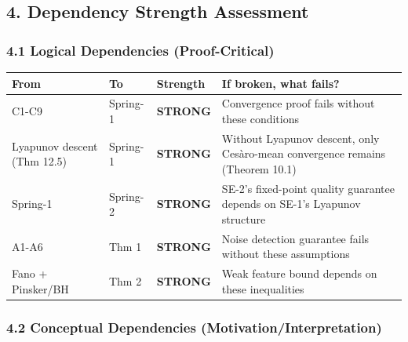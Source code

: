 \documentclass[
  12pt,
]{article}
\begin{document}
\subsection{4. Dependency Strength
Assessment}\label{dependency-strength-assessment}

\subsubsection{4.1 Logical Dependencies
(Proof-Critical)}\label{logical-dependencies-proof-critical}

\begin{longtable}[]{@{}
  >{\raggedright\arraybackslash}p{}
  >{\raggedright\arraybackslash}p{}
  >{\raggedright\arraybackslash}p{}
  >{\raggedright\arraybackslash}p{}@{}}
\toprule\noalign{}
\begin{minipage}[b]{\linewidth}\raggedright
From
\end{minipage} & \begin{minipage}[b]{\linewidth}\raggedright
To
\end{minipage} & \begin{minipage}[b]{\linewidth}\raggedright
Strength
\end{minipage} & \begin{minipage}[b]{\linewidth}\raggedright
If broken, what fails?
\end{minipage} \\
\midrule\noalign{}
\endhead
\bottomrule\noalign{}
\endlastfoot
C1-C9 & Spring-1 & \textbf{STRONG} & Convergence proof fails without
these conditions \\
Lyapunov descent (Thm 12.5) & Spring-1 & \textbf{STRONG} & Without
Lyapunov descent, only Cesàro-mean convergence remains (Theorem 10.1) \\
Spring-1 & Spring-2 & \textbf{STRONG} & SE-2's fixed-point quality
guarantee depends on SE-1's Lyapunov structure \\
A1-A6 & Thm 1 & \textbf{STRONG} & Noise detection guarantee fails
without these assumptions \\
Fano + Pinsker/BH & Thm 2 & \textbf{STRONG} & Weak feature bound depends
on these inequalities \\
\end{longtable}

\subsubsection{4.2 Conceptual Dependencies
(Motivation/Interpretation)}\label{conceptual-dependencies-motivationinterpretation}
\end{document}
